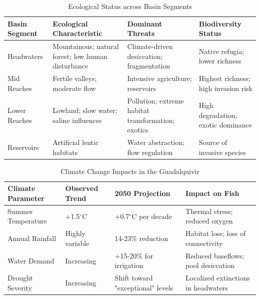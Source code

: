 \documentclass[11pt,a4paper]{article}
\begin{document}
{\newpage

\begin{table}[h!]
\centering
\caption{Ecological Status across Basin Segments}
\begin{tabular}{p{2.5cm} p{3.5cm} p{3.5cm} p{3.5cm}}
\toprule
\textbf{Basin Segment} & \textbf{Ecological Characteristic} & \textbf{Dominant Threats} & \textbf{Biodiversity Status} \\
\midrule
Headwaters & Mountainous; natural forest; low human disturbance & Climate-driven desiccation; fragmentation & Native refugia; lower richness \cite{Herrera2022} \\
\midrule
Mid Reaches & Fertile valleys; moderate flow & Intensive agriculture; reservoirs & Highest richness; high invasion risk \cite{Herrera2022} \\
\midrule
Lower Reaches & Lowland; slow water; saline influences & Pollution; extreme habitat transformation; exotics & High degradation; exotic dominance \cite{Herrera2022} \\
\midrule
Reservoirs & Artificial lentic habitats & Water abstraction; flow regulation & Source of invasive species \cite{Herrera2022} \\
\bottomrule
\end{tabular}
\end{table}

\newpage

\begin{table}[h!]
\centering
\caption{Climate Change Impacts in the Guadalquivir}
\begin{tabular}{p{3cm} p{3cm} p{3.5cm} p{4cm}}
\toprule
\textbf{Climate Parameter} & \textbf{Observed Trend} & \textbf{2050 Projection} & \textbf{Impact on Fish} \\
\midrule
Summer Temperature & +1.5$^\circ$C & +0.7$^\circ$C per decade & Thermal stress; reduced oxygen \\
\midrule
Annual Rainfall & Highly variable & 14-23\% reduction & Habitat loss; loss of connectivity \\
\midrule
Water Demand & Increasing & +15-20\% for irrigation & Reduced baseflows; pool desiccation \\
\midrule
Drought Severity & Increasing & Shift toward "exceptional" levels & Localized extinctions in headwaters \\
\bottomrule
\end{tabular}
\end{table}


}
\end{document}
